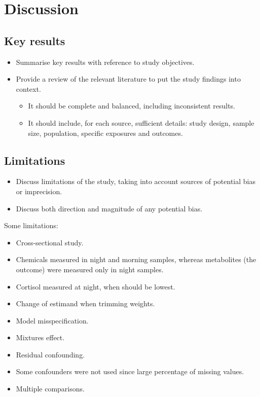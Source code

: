 \documentclass[
  letterpaper,
  DIV=11,
  numbers=noendperiod]{scrartcl}
\providecommand{\tightlist}{%
  \setlength{\itemsep}{0pt}\setlength{\parskip}{0pt}}\usepackage{longtable,booktabs,array}
\begin{document}
\section{Discussion}\label{sec-discussion}

\subsection{Key results}\label{sec-disc-res-key}

\begin{itemize}
\tightlist
\item
  Summarise key results with reference to study objectives.
\item
  Provide a review of the relevant literature to put the study findings
  into context.

  \begin{itemize}
  \tightlist
  \item
    It should be complete and balanced, including inconsistent results.
  \item
    It should include, for each source, sufficient details: study
    design, sample size, population, specific exposures and outcomes.
  \end{itemize}
\end{itemize}

\subsection{Limitations}\label{sec-limitations}

\begin{itemize}
\tightlist
\item
  Discuss limitations of the study, taking into account sources of
  potential bias or imprecision.
\item
  Discuss both direction and magnitude of any potential bias.
\end{itemize}

Some limitations:

\begin{itemize}
\tightlist
\item
  Cross-sectional study.
\item
  Chemicals measured in night and morning samples, whereas metabolites
  (the outcome) were measured only in night samples.
\item
  Cortisol measured at night, when should be lowest.
\item
  Change of estimand when trimming weights.
\item
  Model misspecification.
\item
  Mixtures effect.
\item
  Residual confounding.
\item
  Some confounders were not used since large percentage of missing
  values.
\item
  Multiple comparisons.
\end{itemize}
\end{document}
